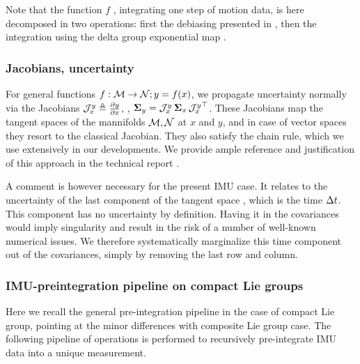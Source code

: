 Note that the function $f$ , integrating one step of motion data, is here decomposed in two operations: 
first the debiasing presented in , then the integration using the delta group exponential map .


\subsubsection{Jacobians, uncertainty}
\label{sec:uncertainty}

For general functions $f:\mathcal{M}\to\mathcal{N};y=f(x)$, we propagate uncertainty normally via the Jacobians 
${\mathcal{J}^{y}_{x}}\triangleq\frac{\partial y}{\partial x}$, \ie, ${\bm \Sigma}_y={\mathcal{J}^{y}_{x}}\,{\bm \Sigma}_x\,{\mathcal{J}^{y}_{x}}^{\top}$. 
These Jacobians map the tangent spaces of the mannifolds $\mathcal{M},\mathcal{N}$ at $x$ and $y$, and in case of vector spaces they resort to the classical Jacobian.
They also satisfy the chain rule, which we use extensively in our developments.
We provide ample reference and justification of this approach in the technical report \cite{sola2018micro}.

A comment is however necessary for the present IMU case.
It relates to the uncertainty of the last component of the tangent space , which is the time $\Delta t$. This component has no uncertainty by definition. 
Having it in the covariances would imply singularity and result in the risk of a number of well-known numerical issues. 
We therefore systematically marginalize this time component out of the covariances, simply by removing the last row and column. 


%
%
%
\subsubsection{IMU-preintegration pipeline on compact Lie groups}

Here we recall the general pre-integration pipeline in the case of compact Lie group, pointing at the minor differences with composite Lie group case.
The following pipeline of operations is performed to recursively pre-integrate IMU data into a unique measurement.

